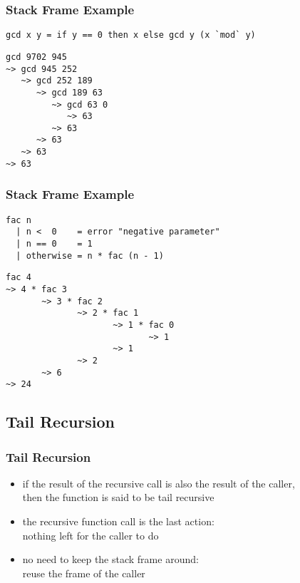 \documentclass[dvipsnames]{beamer}
\theoremstyle{plain}
\begin{document}
\begin{frame}[fragile]
  \frametitle{Stack Frame Example}

  \begin{exampleblock}{}
    \begin{lstlisting}
gcd x y = if y == 0 then x else gcd y (x `mod` y)
    \end{lstlisting}

    \begin{lstlisting}[frame=single]
gcd 9702 945
~> gcd 945 252
   ~> gcd 252 189
      ~> gcd 189 63
         ~> gcd 63 0
            ~> 63
         ~> 63
      ~> 63
   ~> 63
~> 63
    \end{lstlisting}
  \end{exampleblock}
\end{frame}

\begin{frame}[fragile]
  \frametitle{Stack Frame Example}

  \begin{exampleblock}{}
    \begin{lstlisting}
fac n
  | n <  0    = error "negative parameter"
  | n == 0    = 1
  | otherwise = n * fac (n - 1)
    \end{lstlisting}

    \begin{lstlisting}[frame=single]
fac 4
~> 4 * fac 3
       ~> 3 * fac 2
              ~> 2 * fac 1
                     ~> 1 * fac 0
                            ~> 1
                     ~> 1
              ~> 2
       ~> 6
~> 24
    \end{lstlisting}
  \end{exampleblock}
\end{frame}

\subsection{Tail Recursion}

\begin{frame}
  \frametitle{Tail Recursion}

  \begin{itemize}
    \item if the result of the recursive call is also the result of the caller,\\
      then the function is said to be \alert{tail recursive}
    \item the recursive function call is the last action:\\
      nothing left for the caller to do

    \pause
    \medskip
    \item no need to keep the stack frame around:\\
      reuse the frame of the caller
  \end{itemize}
\end{frame}
\end{document}
